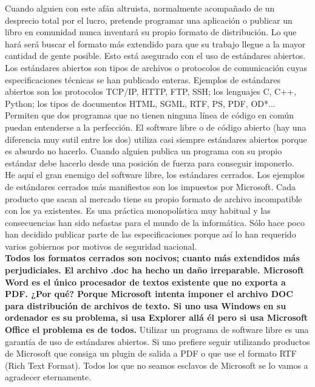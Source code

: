 Cuando alguien con este afán altruista, normalmente acompañado de un
desprecio total por el lucro, pretende programar una aplicación o
publicar un libro en comunidad nunca inventará su propio formato de
distribución. Lo que hará será buscar el formato más extendido para
que su trabajo llegue a la mayor cantidad de gente posible. Esto
está asegurado con el uso de estándares abiertos.\\


Los estándares abiertos son tipos de archivos o protocolos de
comunicación cuyas especificaciones técnicas se han publicado enteras.
Ejemplos de estándares abiertos son los protocolos TCP/IP, HTTP, FTP,
SSH; los lenguajes C, C++, Python; los tipos de documentos HTML, SGML,
RTF, PS, PDF, OD{*}... Permiten que dos programas que no tienen
ninguna línea de código en común puedan entenderse a la perfección. El
software libre o de código abierto (hay una diferencia muy sutil entre
los dos) utiliza casi siempre estándares abiertos porque es absurdo no
hacerlo. Cuando alguien publica un programa con su propio estándar
debe hacerlo desde una posición de fuerza para conseguir imponerlo.\\


He aquí el gran enemigo del software libre, los estándares cerrados.
Los ejemplos de estándares cerrados más manifiestos son los impuestos
por Microsoft. Cada producto que sacan al mercado tiene su propio
formato de archivo incompatible con los ya existentes. Es una práctica
monopolística muy habitual y las consecuencias han sido nefastas para
el mundo de la informática. Sólo hace poco han decidido publicar parte
de las especificaciones porque así lo han requerido varios gobiernos
por motivos de seguridad nacional.\\


\textbf{Todos los formatos cerrados son nocivos; cuanto más extendidos
  más perjudiciales. El archivo .doc ha hecho un daño irreparable.
  Microsoft Word es el único procesador de textos existente que no
  exporta a PDF.  ¿Por qué? Porque Microsoft intenta imponer el
  archivo DOC para distribución de archivos de texto. Si uno usa
  Windows en su ordenador es su problema, si usa Explorer allá él pero
  si usa Microsoft Office el problema es de todos.} Utilizar un
programa de software libre es una garantía de uso de estándares
abiertos. Si uno prefiere seguir utilizando productos de Microsoft que
consiga un plugin de salida a PDF o que use el formato RTF (Rich Text
Format). Todos los que no seamos esclavos de Microsoft
se lo vamos a agradecer eternamente.\\


